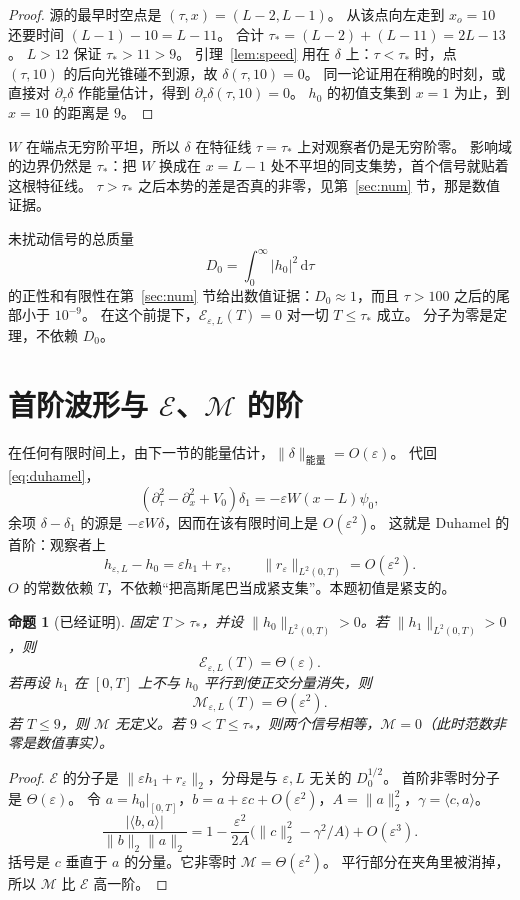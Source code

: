 \documentclass[11pt]{ctexart}
\newtheorem{proposition}[theorem]{命题}
\theoremstyle{definition}
\theoremstyle{remark}
\newcommand{\eps}{\varepsilon}
\newcommand{\rd}{\mathrm{d}}
\newcommand{\cE}{\mathcal E}
\newcommand{\cM}{\mathcal M}
\begin{document}
\begin{proof}
源的最早时空点是 $(\tau,x)=(L-2,L-1)$。
从该点向左走到 $x_o=10$ 还要时间 $(L-1)-10=L-11$。
合计 $\tau_*=(L-2)+(L-11)=2L-13$。
$L>12$ 保证 $\tau_*>11>9$。
引理~\ref{lem:speed} 用在 $\delta$ 上：$\tau<\tau_*$ 时，点 $(\tau,10)$ 的后向光锥碰不到源，故 $\delta(\tau,10)=0$。
同一论证用在稍晚的时刻，或直接对 $\partial_\tau\delta$ 作能量估计，得到 $\partial_\tau\delta(\tau,10)=0$。
$h_0$ 的初值支集到 $x=1$ 为止，到 $x=10$ 的距离是 $9$。
\end{proof}

$W$ 在端点无穷阶平坦，所以 $\delta$ 在特征线 $\tau=\tau_*$ 上对观察者仍是无穷阶零。
影响域的边界仍然是 $\tau_*$：把 $W$ 换成在 $x=L-1$ 处不平坦的同支集势，首个信号就贴着这根特征线。
$\tau>\tau_*$ 之后本势的差是否真的非零，见第~\ref{sec:num} 节，那是数值证据。

未扰动信号的总质量
\[
D_0=\int_0^\infty|h_0|^2\,\rd\tau
\]
的正性和有限性在第~\ref{sec:num} 节给出数值证据：$D_0\approx1$，而且 $\tau>100$ 之后的尾部小于 $10^{-9}$。
在这个前提下，$\cE_{\eps,L}(T)=0$ 对一切 $T\le\tau_*$ 成立。
分子为零是定理，不依赖 $D_0$。

\section{首阶波形与 $\cE$、$\cM$ 的阶}

在任何有限时间上，由下一节的能量估计，$\|\delta\|_{能量}=O(\eps)$。
代回 \eqref{eq:duhamel}，
\[
(\partial_\tau^2-\partial_x^2+V_0)\delta_1=-\eps W(x-L)\psi_0,
\]
余项 $\delta-\delta_1$ 的源是 $-\eps W\delta$，因而在该有限时间上是 $O(\eps^2)$。
这就是 Duhamel 的首阶：观察者上
\[
h_{\eps,L}-h_0=\eps h_1+r_\eps,\qquad \|r_\eps\|_{L^2(0,T)}=O(\eps^2).
\]
$O$ 的常数依赖 $T$，不依赖“把高斯尾巴当成紧支集”。本题初值是紧支的。

\begin{proposition}[已经证明]
\label{prop:orders}
固定 $T>\tau_*$，并设 $\|h_0\|_{L^2(0,T)}>0$。若 $\|h_1\|_{L^2(0,T)}>0$，则
\[
\cE_{\eps,L}(T)=\Theta(\eps).
\]
若再设 $h_1$ 在 $[0,T]$ 上不与 $h_0$ 平行到使正交分量消失，则
\[
\cM_{\eps,L}(T)=\Theta(\eps^2).
\]
若 $T\le9$，则 $\cM$ 无定义。若 $9<T\le\tau_*$，则两个信号相等，$\cM=0$（此时范数非零是数值事实）。
\end{proposition}

\begin{proof}
$\cE$ 的分子是 $\|\eps h_1+r_\eps\|_2$，分母是与 $\eps,L$ 无关的 $D_0^{1/2}$。
首阶非零时分子是 $\Theta(\eps)$。
令 $a=h_0|_{[0,T]}$，$b=a+\eps c+O(\eps^2)$，$A=\|a\|_2^2$，$\gamma=\langle c,a\rangle$。
\[
\frac{|\langle b,a\rangle|}{\|b\|_2\|a\|_2}
=1-\frac{\eps^2}{2A}\bigl(\|c\|_2^2-\gamma^2/A\bigr)+O(\eps^3).
\]
括号是 $c$ 垂直于 $a$ 的分量。它非零时 $\cM=\Theta(\eps^2)$。
平行部分在夹角里被消掉，所以 $\cM$ 比 $\cE$ 高一阶。
\end{proof}
\end{document}
